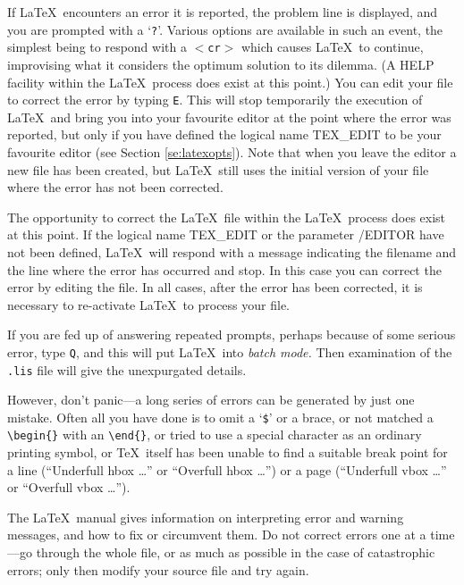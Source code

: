 If \LaTeX\ encounters an error it is reported, the problem line is displayed,
and you are prompted with a `{\tt ?}'.  Various options are available in such
an event, the simplest being to respond with a {\tt $<$cr$>$} which causes
\LaTeX\ to continue, improvising what it considers the optimum solution to its
dilemma.  (A HELP facility within the \LaTeX\ process does exist at this
point.) You can edit your file to correct the error by typing \mbox{\tt E}.
This will  stop temporarily the execution of \LaTeX\ and bring you into your
favourite  editor at the point where the error was reported, but only if you
have defined the logical name TEX\_EDIT to be your favourite editor (see
Section \ref{se:latexopts}). Note that when you leave the editor a new file has
been created, but \LaTeX\ still uses the initial version of your file where the
error has not been corrected. 

The opportunity to correct the \LaTeX\ file within the \LaTeX\
process does exist at this point. If the logical name TEX\_EDIT or
the parameter /EDITOR have not been defined, \LaTeX\ will respond with a message
indicating the filename and the line where the error has occurred and stop. In
this case you can correct the error by editing the file. In all cases, after
the error has been corrected, it is necessary to re-activate \LaTeX\ to process
your file.

If you are fed up of answering repeated prompts, perhaps because of some
serious error, type \mbox{\tt Q}, and this will put \LaTeX\ into
{\em batch mode.} Then examination of the \mbox{\tt .lis} file will give the 
unexpurgated details.

However, don't panic---a long series of errors can be generated by just
one mistake. Often all you have done is to omit a `{\tt \$}' or a brace, or
not matched a \hbox{\verb|\begin{}|} with an \hbox{\verb|\end{}|}, or tried
to use a special character as an ordinary printing symbol, or \TeX\
itself has been unable to find a suitable break point for a line 
(``Underfull hbox \ldots'' or ``Overfull hbox \ldots'') or a page 
(``Underfull vbox \ldots'' or ``Overfull vbox \ldots'').  

The \LaTeX\ manual gives information on
interpreting error and warning messages, and how to fix or circumvent them.
Do not correct errors one at a time---go through the whole file, or as much 
as possible in the case of catastrophic errors; only then modify your
source file and try again.

